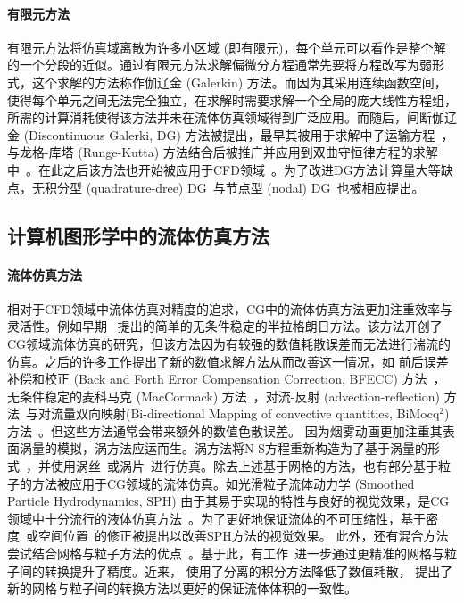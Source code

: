 \paragraph{有限元方法}
有限元方法将仿真域离散为许多小区域 (即有限元)，每个单元可以看作是整个解的一个分段的近似。通过有限元方法求解偏微分方程通常先要将方程改写为弱形式，这个求解的方法称作伽辽金 (Galerkin) 方法。而因为其采用连续函数空间，使得每个单元之间无法完全独立，在求解时需要求解一个全局的庞大线性方程组，所需的计算消耗使得该方法并未在流体仿真领域得到广泛应用。而随后，间断伽辽金 (Discontinuous Galerki, DG) 方法被提出，最早其被用于求解中子运输方程~\citep{reed1973triangular}，与龙格-库塔 (Runge-Kutta) 方法结合后被推广并应用到双曲守恒律方程的求解中~\citep{cockburn2001runge, cockburn1990runge, cockburn1989tvb2, cockburn1989tvb3}。在此之后该方法也开始被应用于CFD领域~\citep{Zienkiewicz-2013, lomtev1999discontinuous, bassi1997high}。为了改进DG方法计算量大等缺点，无积分型 (quadrature-dree) DG~\citep{atkins1998quadrature}与节点型 (nodal) DG~\citep{hesthaven2007nodal}也被相应提出。

\subsection{计算机图形学中的流体仿真方法}
\label{sec:1_related_works_CG}
\paragraph{流体仿真方法}
相对于CFD领域中流体仿真对精度的追求，CG中的流体仿真方法更加注重效率与灵活性。例如早期~\citet{Stam-1999} 提出的简单的无条件稳定的半拉格朗日方法。该方法开创了CG领域流体仿真的研究，但该方法因为有较强的数值耗散误差而无法进行湍流的仿真。之后的许多工作提出了新的数值求解方法从而改善这一情况，如 前后误差补偿和校正 (Back and Forth Error Compensation Correction, BFECC) 方法~\citep{Kim-2005}，无条件稳定的麦科马克 (MacCormack) 方法~\citep{Selle-2008}，对流-反射 (advection-reflection) 方法~\citep{Zehnder-2018}与对流量双向映射(Bi-directional Mapping of convective quantities, BiMocq$^2$) 方法~\citep{Qu-2019}。但这些方法通常会带来额外的数值色散误差。
因为烟雾动画更加注重其表面涡量的模拟，涡方法应运而生。涡方法将N-S方程重新构造为了基于涡量的形式~\citep{Park-2005, Selle-2005}，并使用涡丝~\citep{Weissmann-2010, Angelidis-2005}或涡片~\citep{Zhang-2015, Zhang-2014, Pfaff-2012}进行仿真。除去上述基于网格的方法，也有部分基于粒子的方法被应用于CG领域的流体仿真。如光滑粒子流体动力学 (Smoothed Particle Hydrodynamics, SPH) 由于其易于实现的特性与良好的视觉效果，是CG领域中十分流行的液体仿真方法~\citep{Ihmsen-2014-1, Becker-2007, Adams-2007, Muller-2003, Desbrun-1996}。为了更好地保证流体的不可压缩性，基于密度~\citep{Bender-2015, Ihmsen-2014-2, Solenthaler-2009}或空间位置~\citep{Macklin-2013}的修正被提出以改善SPH方法的视觉效果。
此外，还有混合方法尝试结合网格与粒子方法的优点~\citep{Zhu-2005, Foster-1996, Brackbill-1986, Harlow-1962}。基于此，有工作~\citep{Fu-2017, Jiang-2015}进一步通过更精准的网格与粒子间的转换提升了精度。近来，\citet{Fei-2021} 使用了分离的积分方法降低了数值耗散，\citet{Qu-2022} 提出了新的网格与粒子间的转换方法以更好的保证流体体积的一致性。

